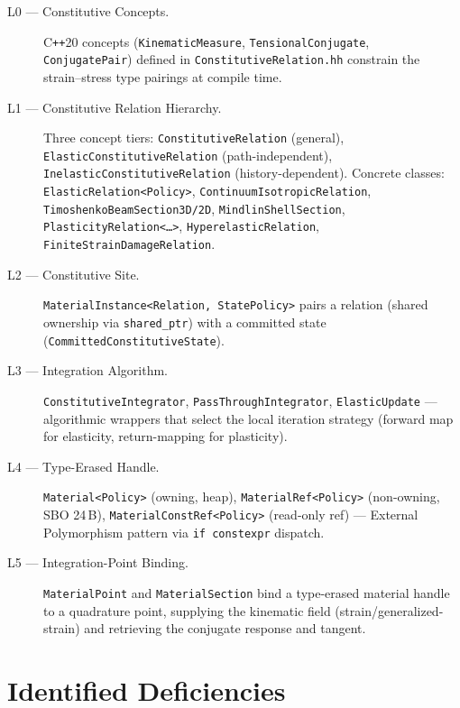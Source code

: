 \begin{description}
  \item[L0 --- Constitutive Concepts.]
    C\texttt{++}20 concepts
    (\texttt{KinematicMeasure}, \texttt{TensionalConjugate}, \texttt{ConjugatePair})
    defined in \texttt{ConstitutiveRelation.hh}
    constrain the strain--stress type pairings at compile time.

  \item[L1 --- Constitutive Relation Hierarchy.]
    Three concept tiers:
    \texttt{ConstitutiveRelation} (general),
    \texttt{ElasticConstitutiveRelation} (path-independent),
    \texttt{InelasticConstitutiveRelation} (history-dependent).
    Concrete classes: \texttt{ElasticRelation<Policy>},
    \texttt{ContinuumIsotropicRelation},
    \texttt{TimoshenkoBeamSection3D/2D},
    \texttt{MindlinShellSection},
    \texttt{PlasticityRelation<\ldots>},
    \texttt{HyperelasticRelation},
    \texttt{FiniteStrainDamageRelation}.

  \item[L2 --- Constitutive Site.]
    \texttt{MaterialInstance<Relation, StatePolicy>}
    pairs a relation (shared ownership via \texttt{shared\_ptr}) with a
    committed state (\texttt{CommittedConstitutiveState}).

  \item[L3 --- Integration Algorithm.]
    \texttt{ConstitutiveIntegrator},
    \texttt{PassThroughIntegrator},
    \texttt{ElasticUpdate} ---
    algorithmic wrappers that select the local iteration strategy
    (forward map for elasticity, return-mapping for plasticity).

  \item[L4 --- Type-Erased Handle.]
    \texttt{Material<Policy>} (owning, heap),
    \texttt{MaterialRef<Policy>} (non-owning, SBO 24\,B),
    \texttt{MaterialConstRef<Policy>} (read-only ref) ---
    External Polymorphism pattern via \texttt{if constexpr} dispatch.

  \item[L5 --- Integration-Point Binding.]
    \texttt{MaterialPoint} and \texttt{MaterialSection} bind a type-erased
    material handle to a quadrature point, supplying the kinematic
    field (strain/generalized-strain) and retrieving the conjugate
    response and tangent.
\end{description}


\section{Identified Deficiencies}
\label{sec:mat-deficiencies}

